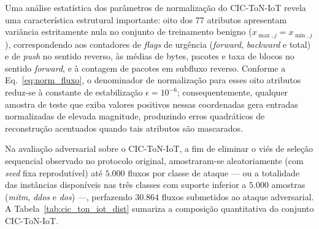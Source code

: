 \documentclass[conference]{IEEEtran}
\begin{document}
Uma análise estatística dos parâmetros de normalização do CIC-ToN-IoT revela uma característica estrutural importante: oito dos $77$ atributos apresentam variância estritamente nula no conjunto de treinamento benigno ($x_{\max, j} = x_{\min, j}$), correspondendo aos contadores de \textit{flags} de urgência (\textit{forward}, \textit{backward} e total) e de \textit{push} no sentido reverso, às médias de bytes, pacotes e taxa de blocos no sentido \textit{forward}, e à contagem de pacotes em subfluxo reverso.
Conforme a Eq.~\eqref{eq:norm_fluxo}, o denominador de normalização para esses oito atributos reduz-se à constante de estabilização $\epsilon = 10^{-6}$; consequentemente, qualquer amostra de teste que exiba valores positivos nessas coordenadas gera entradas normalizadas de elevada magnitude, produzindo erros quadráticos de reconstrução acentuados quando tais atributos são mascarados.

Na avaliação adversarial sobre o CIC-ToN-IoT, a fim de eliminar o viés de seleção sequencial observado no protocolo original, amostraram-se aleatoriamente (com \textit{seed} fixa reprodutível) até $5.000$ fluxos por classe de ataque — ou a totalidade das instâncias disponíveis nas três classes com suporte inferior a $5.000$ amostras (\textit{mitm}, \textit{ddos} e \textit{dos}) —, perfazendo $30.864$ fluxos submetidos ao ataque adversarial.
A Tabela~\ref{tab:cic_ton_iot_dist} sumariza a composição quantitativa do conjunto CIC-ToN-IoT.
\end{document}
